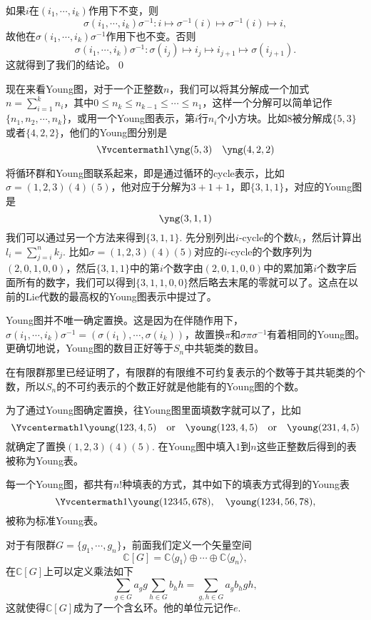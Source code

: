 \documentclass[9pt]{extarticle}
\newcommand{\cc}{\mathbb{C}}
\begin{document}
\proof 如果$i$在$(i_1,\cdots,i_k)$作用下不变，则
\[\sigma (i_1,\cdots,i_k)\sigma^{-1}:i\mapsto \sigma^{-1}(i)\mapsto \sigma^{-1}(i) \mapsto i,\]
故他在$\sigma (i_1,\cdots,i_k)\sigma^{-1}$作用下也不变。否则
\[
	\sigma (i_1,\cdots,i_k)\sigma^{-1}:\sigma(i_j)\mapsto i_j\mapsto i_{j+1} \mapsto \sigma(i_{j+1}).
\]
这就得到了我们的结论。\qed

\para 现在来看Young图，对于一个正整数$n$，我们可以将其分解成一个加式$n=\sum_{i=1}^k n_i$，其中$0\leq n_k\leq n_{k-1}\leq \cdots \leq n_1$，这样一个分解可以简单记作$\{n_1,n_2,\cdots,n_k\}$，或用一个Young图表示，第$i$行$n_i$个小方块。比如$8$被分解成$\{5,3\}$或者$\{4,2,2\}$，他们的Young图分别是
\[\Yvcentermath1
	\yng(5,3)\quad \yng(4,2,2)
\]

将循环群和Young图联系起来，即是通过循环的cycle表示，比如$\sigma=(1,2,3)(4)(5)$，他对应于分解为$3+1+1$，即$\{3,1,1\}$，对应的Young图是
\[
	\yng(3,1,1)
\]
我们可以通过另一个方法来得到$\{3,1,1\}$. 先分别列出$i$-cycle的个数$k_i$，然后计算出$l_i=\sum_{j=i}^nk_j$. 比如$\sigma=(1,2,3)(4)(5)$对应的$i$-cycle的个数序列为$(2,0,1,0,0)$，然后$\{3,1,1\}$中的第$i$个数字由$(2,0,1,0,0)$中的累加第$i$个数字后面所有的数字，我们可以得到$\{3,1,1,0,0\}$然后略去末尾的零就可以了。这点在以前的Lie代数的最高权的Young图表示中提过了。

Young图并不唯一确定置换。这是因为在伴随作用下，$\sigma (i_1,\cdots,i_k)\sigma^{-1}= (\sigma(i_1),\cdots,\sigma(i_k))$，故置换$\pi$和$\sigma\pi\sigma^{-1}$有着相同的Young图。更确切地说，Young图的数目正好等于$S_n$中共轭类的数目。

在有限群那里已经证明了，有限群的有限维不可约复表示的个数等于其共轭类的个数，所以$S_n$的不可约表示的个数正好就是他能有的Young图的个数。

\para 为了通过Young图确定置换，往Young图里面填数字就可以了，比如
\[\Yvcentermath1
	\young(123,4,5)\quad \text{or}\quad \young(123,4,5)\quad \text{or}\quad \young(231,4,5)
\]
就确定了置换$(1,2,3)(4)(5)$. 在Young图中填入$1$到$n$这些正整数后得到的表被称为Young表。

每一个Young图，都共有$n!$种填表的方式，其中如下的填表方式得到的Young表
\[\Yvcentermath1
	\young(12345,678),\quad \young(1234,56,78),
\]
被称为标准Young表。

\para 对于有限群$G=\{g_1,\cdots,g_n\}$，前面我们定义一个矢量空间
\[
	\cc [G]=\cc\langle g_1\rangle \oplus \cdots \oplus \cc\langle g_n\rangle,
\]
在$\cc [G]$上可以定义乘法如下
\[
	\sum_{g\in G} a_g g \sum_{h\in G} b_h h=\sum_{g,h\in G}a_gb_h gh,
\]
这就使得$\cc [G]$成为了一个含幺环。他的单位元记作$e$.
\end{document}

